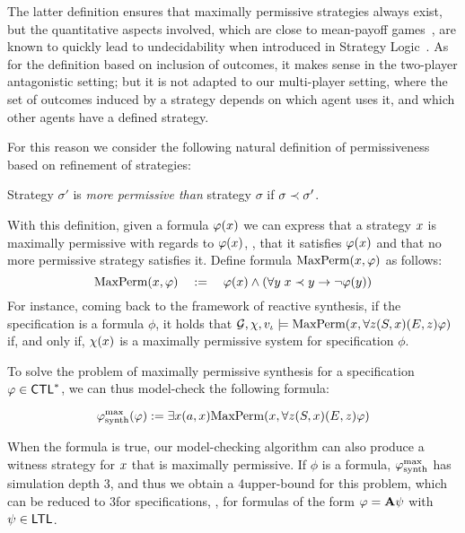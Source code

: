 The latter definition ensures that
maximally permissive strategies always exist, but the quantitative
aspects involved, which are close to mean-payoff
games~\cite{ehrenfeucht1979positional,gurvich1988cyclic}, are known to
quickly lead to undecidability when introduced in Strategy Logic~\cite{gardy2017semantics}.
As for the definition based on inclusion of outcomes, it makes sense in the
two-player antagonistic setting; but it is not adapted to our multi-player setting, where the set of
outcomes induced by a strategy depends on which agent uses it, and
which other agents have a defined strategy.

For this reason we consider the following natural definition of permissiveness based on refinement
of strategies:
\begin{definition}
  \label{def-permissive}
  Strategy $\sigma'$ is \emph{more permissive than} strategy $\sigma$
  if $\sigma\refinesstr\sigma'$. 
\end{definition}

With this definition, given a formula $\phi(\var)$ we can express that a strategy $\var$
  is maximally permissive with regards to  $\phi(\var)$, \ie, that
  it satisfies $\phi(\var)$ and that no more permissive strategy
  satisfies it. Define formula $\maxperm(\var,\phi)$ as
  follows:
  \[\maxperm(\var,\phi) \quad := \quad \phi(\var) \wedge (\forall \varb \;
    \var \refinesstr \varb \impl \neg \phi(\varb))\]
  For instance, coming back to the framework of reactive synthesis, if
the specification is a  \CTLs formula $\phi$, it holds that
  $\CGS,\assign,\pos_\init\models \maxperm(\var,\forall \varc
  \bind[S]{\var}\bind[E]{\varc}\phi)$ if, and only
  if, $\assign(\var)$ is a maximally permissive system for
  specification $\phi$.

To solve the problem of maximally permissive synthesis for a specification $\phi\in\CTLs$,  we can thus model-check the
following \SLref formula:

\[\phisynthmp(\phi):=\exists\var (\ag,\var) \maxperm(\var,\forall \varc
  \bind[S]{\var}\bind[E]{\varc}\phi)\]

When the formula is true, our model-checking algorithm can also
produce a witness strategy for $\var$ that is maximally permissive.
If $\phi$ is a \CTLs formula, $\phisynthmp$ has simulation depth 3,
and thus we obtain a 4\EXPTIME upper-bound for this problem, which can
be reduced to 3\EXPTIME for \LTL specifications, \ie, for formulas of
the form $\phi=\A\psi$ with $\psi\in\LTL$.



